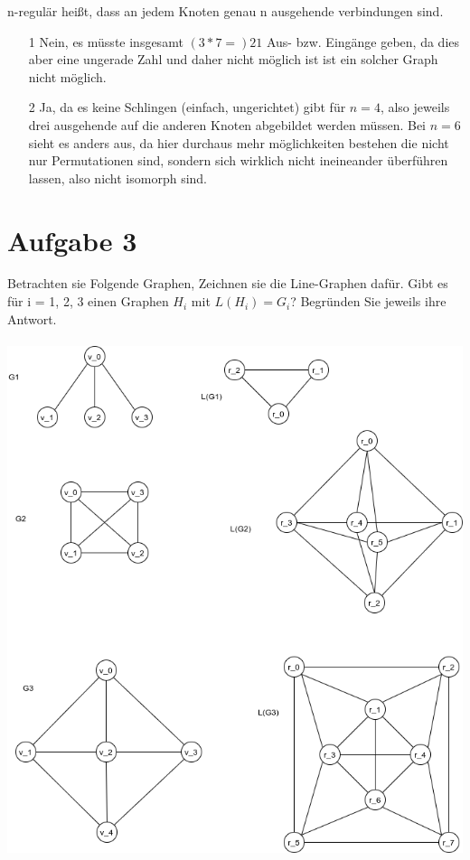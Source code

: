 \documentclass{scrartcl}
\begin{document}
n-regulär heißt, dass an jedem Knoten genau n ausgehende verbindungen sind.

\begin{itemize}
    \item[1] Nein, es müsste insgesamt $(3 * 7 = ) 21$ Aus- bzw. Eingänge
        geben, da dies aber eine ungerade Zahl und daher nicht möglich ist ist
        ein solcher Graph nicht möglich.
    \item[2] Ja, da es keine Schlingen (einfach, ungerichtet) gibt für $n = 4$,
        also jeweils drei ausgehende auf die anderen Knoten abgebildet werden
        müssen. Bei $n = 6$ sieht es anders aus, da hier durchaus mehr
        möglichkeiten bestehen die nicht nur Permutationen sind, sondern sich
        wirklich nicht ineineander überführen lassen, also nicht isomorph sind.
\end{itemize}

\section*{Aufgabe 3}

Betrachten sie Folgende Graphen, Zeichnen sie die Line-Graphen
dafür. Gibt es für i = 1, 2, 3 einen Graphen $H_i$ mit $L(H_i) =
G_i$? Begründen Sie jeweils ihre Antwort. \\ \\


\includegraphics[width=14cm]{Graphs.png}
\end{document}
